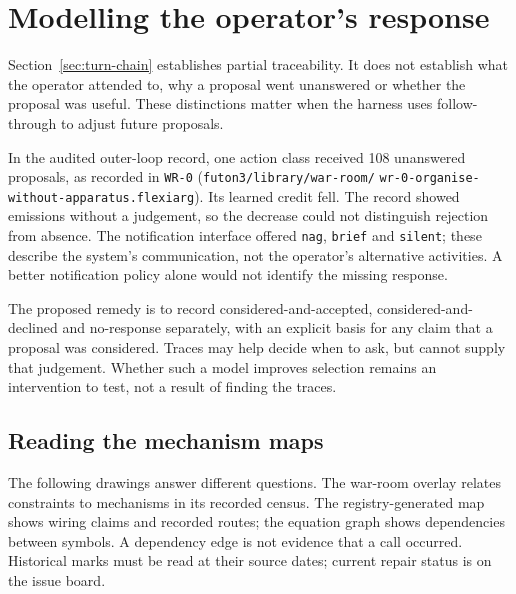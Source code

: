 \section{Modelling the operator's response}\label{sec:operator}

Section~\ref{sec:turn-chain} establishes partial traceability. It does not
establish what the operator attended to, why a proposal went unanswered or
whether the proposal was useful. These distinctions matter when the harness
uses follow-through to adjust future proposals.

In the audited outer-loop record, one action class received 108 unanswered
proposals, as recorded in \texttt{WR-0} (\texttt{futon3/library/war-room/}
\texttt{wr-0-organise-without-apparatus.flexiarg}). Its learned credit fell.
The record showed emissions
without a judgement, so the decrease could not distinguish rejection from
absence. The notification interface offered \texttt{nag}, \texttt{brief} and
\texttt{silent}; these describe the system's communication, not the operator's
alternative activities. A better notification policy alone would not identify
the missing response.

The proposed remedy is to record considered-and-accepted,
considered-and-declined and no-response separately, with an explicit basis for
any claim that a proposal was considered. Traces may help decide when to ask,
but cannot supply that judgement. Whether such a model improves selection
remains an intervention to test, not a result of finding the traces.

\subsection*{Reading the mechanism maps}

The following drawings answer different questions. The war-room overlay relates
constraints to mechanisms in its recorded census. The registry-generated map
shows wiring claims and recorded routes; the equation graph shows dependencies
between symbols. A dependency edge is not evidence that a call occurred.
Historical marks must be read at their source dates; current repair status is
on the issue board.

